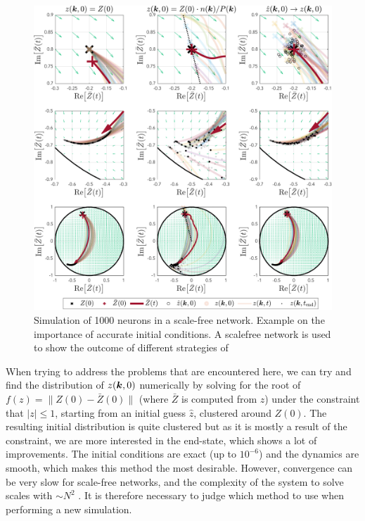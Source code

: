 \begin{figure}[H]
\centering
\includegraphics[width = \textwidth]{../Figures/PhaseSpace/Mappings.pdf}
   \caption{Simulation of 1000 neurons in a scale-free network. Example on the importance of accurate initial conditions. A scalefree network is used to show the outcome of different strategies of }
   \label{fig:mappings}
\end{figure}

When trying to address the problems that are encountered here, we can try and find the distribution of $z({\boldsymbol{k}},0)$ numerically by solving for the root of $f(z) = \| Z(0) - \bar{Z}(0) \|$ (where $\bar{Z}$ is computed from $z$) under the constraint that $| z | \leq 1$, starting from an initial guess $\hat{z}$, clustered around $Z(0)$. The resulting initial distribution is quite clustered but as it is mostly a result of the constraint, we are more interested in the end-state, which shows a lot of improvements. The initial conditions are exact (up to $10^{-6}$) and the dynamics are smooth, which makes this method the most desirable. However, convergence can be very slow for scale-free networks, and the complexity of the system to solve scales with $\sim N^2$ . It is therefore necessary to judge which method to use when performing a new simulation.


